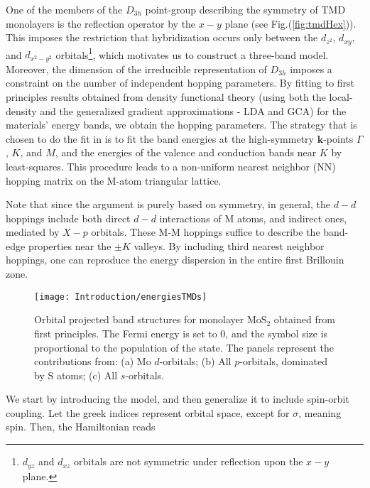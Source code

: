 One of the members of the $D_{3h}$ point-group describing the symmetry of \ac{TMD} monolayers is the reflection operator by the $x-y$ plane (see Fig.(\ref{fig:tmdHex})).
This imposes the restriction that hybridization occurs only between the $d_{z^2}$, $d_{xy}$, and $d_{x^2 - y^2}$ orbitals\footnote{$d_{yz}$ and $d_{xz}$ orbitals are not symmetric under reflection upon the $x-y$ plane.}, which motivates us to construct a three-band model.
Moreover, the dimension of the irreducible representation of $D_{3h}$ imposes a constraint on the number of independent hopping parameters.
By fitting to first principles results obtained from density functional theory (using both the local-density and the generalized gradient approximations - LDA and GCA) for the materials' energy bands, we obtain the hopping parameters.
The strategy that is chosen to do the fit in \cite{liu_three-band_2013} is to fit the band energies at the high-symmetry $\bm k$-points $\Gamma$, $K$, and $M$, and the energies of the valence and conduction bands near $K$ by least-squares.
This procedure leads to a non-uniform nearest neighbor (NN) hopping matrix on the M-atom triangular lattice.

Note that since the argument is purely based on symmetry, in general, the $d-d$ hoppings include both direct $d-d$ interactions of M atoms, and indirect ones, mediated by $X-p$ orbitals.
These M-M hoppings suffice to describe the band-edge properties near the $\pm K$ valleys.
By including third nearest neighbor hoppings, one can reproduce the energy dispersion in  the entire first Brillouin zone.

\begin{figure}[H]
\centering
\texttt{[image: Introduction/energiesTMDs]}
\caption[Orbital projected band structures for monolayer $\text{Mo}\text{S}_2$ obtained from first principles.]{Orbital projected band structures for monolayer $\text{Mo}\text{S}_2$ obtained from first principles.
The Fermi energy is set to 0, and the symbol size is proportional to the population of the state.
The panels represent the contributions from: (a) $\text{Mo}$ $d$-orbitals; (b) All $p$-orbitals, dominated by $\text{S}$ atoms; (c) All $s$-orbitals. }
\label{fig:energiesTMDs}
\end{figure}	

We start by introducing the  model, and then generalize it to include spin-orbit coupling.
Let the greek indices represent orbital space, except for $\sigma$, meaning spin.
Then, the Hamiltonian reads


